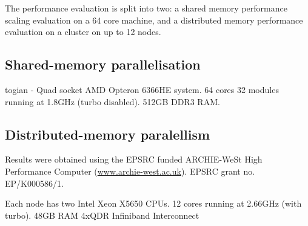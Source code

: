 The performance evaluation is split into two: a shared memory performance
scaling evaluation on a 64 core machine, and a distributed memory performance
evaluation on a cluster on up to 12 nodes.

\subsection{Shared-memory parallelisation}

togian - Quad socket AMD Opteron 6366HE system. 64 cores 32 modules running at
1.8GHz (turbo disabled). 512GB DDR3 RAM.

\subsection{Distributed-memory paralellism}

Results were obtained using the EPSRC funded ARCHIE-WeSt High Performance
Computer (\url{www.archie-west.ac.uk}). EPSRC grant no. EP/K000586/1.

Each node has two Intel Xeon X5650 CPUs. 12 cores running at 2.66GHz (with
turbo). 48GB RAM 4xQDR Infiniband Interconnect
